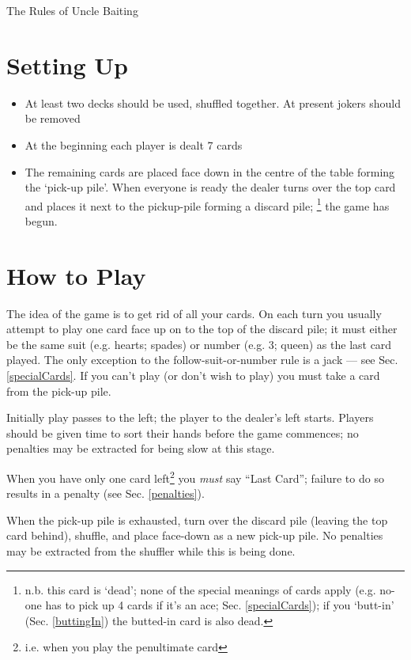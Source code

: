 \documentclass[12pt]{article}
\newcommand{\Sec}[1]{Sec. \ref{#1}}
\begin{document}
\begin{center}
  \Large The Rules of Uncle Baiting
\end{center}


\section{Setting Up}

\begin{itemize}
\item At least two decks should be used, shuffled together.  At present jokers should be removed
  
\item At the beginning each player is dealt 7 cards
  
\item The remaining cards are placed face down in the centre of the table forming the `pick-up pile'.
  When everyone is ready the dealer turns over the 
  top card and places it next to the pickup-pile forming a discard pile;%
\footnote{n.b. this card is `dead'; none of the special meanings of cards apply (e.g.
no-one has to pick up 4 cards if it's an ace; \Sec{specialCards}); if you 
`butt-in' (\Sec{buttingIn}) the butted-in card is also dead.}
the game has begun.

\end{itemize}

\section{How to Play}

The idea of the game is to get rid of all your cards.  On each turn you usually attempt to play one card face up on to
the top of the discard pile; it must either be the same suit (e.g. hearts; spades) or number (e.g.  3; queen) as the
last card played.  The only exception to the follow-suit-or-number rule is a jack --- see \Sec{specialCards}.  If you
can't play (or don't wish to play) you must take a card from the pick-up pile.

Initially play passes to the left; the player to the dealer's left starts.
Players should be given time to sort their hands before the game commences; no
penalties may be extracted for being slow at this stage.

When you have only one card left\footnote{i.e. when you play the penultimate card}
you \emph{must} say ``Last Card'';  failure to do
so results in a penalty (see \Sec{penalties}).

When the pick-up pile is exhausted, turn over the discard pile (leaving the top card behind),
shuffle, and place face-down as a new pick-up pile.  No penalties may be extracted from the
shuffler while this is being done.
\end{document}
